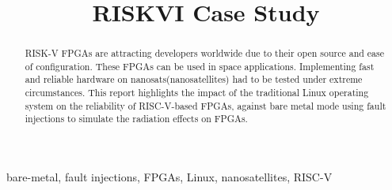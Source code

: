 \documentclass[conference]{IEEEtran}
\begin{document}
\title{RISKVI Case Study\\}
\author{
}
\maketitle

\begin{abstract}
RISK-V FPGAs are attracting developers worldwide due to their open source and 
ease of configuration. These FPGAs can be used in space applications. Implementing fast and reliable 
hardware on nanosats(nanosatellites) had to be tested under extreme circumstances. This report highlights the
impact of the traditional Linux operating system on the reliability of RISC-V-based FPGAs, against bare metal mode 
using fault injections to simulate the radiation effects on FPGAs. 
\end{abstract}
\begin{IEEEkeywords}
bare-metal, fault injections, FPGAs, Linux, nanosatellites, RISC-V
\end{IEEEkeywords}

\end{document}
